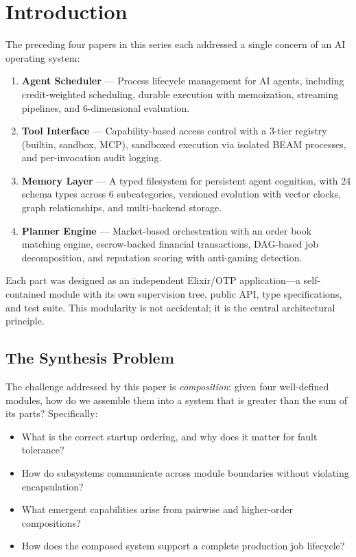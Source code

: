 \documentclass[12pt,a4paper]{article}
\theoremstyle{definition}
\begin{document}
\clearpage
\tableofcontents
\clearpage

\section{Introduction}\label{sec:intro}

The preceding four papers in this series each addressed a single concern
of an AI operating system:

\begin{enumerate}[label=\textbf{Part \Roman*:}, leftmargin=3.5em]
  \item \textbf{Agent Scheduler} --- Process lifecycle management for AI agents,
        including credit-weighted scheduling, durable execution with memoization,
        streaming pipelines, and 6-dimensional evaluation.
  \item \textbf{Tool Interface} --- Capability-based access control with a 3-tier
        registry (builtin, sandbox, MCP), sandboxed execution via isolated BEAM
        processes, and per-invocation audit logging.
  \item \textbf{Memory Layer} --- A typed filesystem for persistent agent cognition,
        with 24 schema types across 6 subcategories, versioned evolution with vector
        clocks, graph relationships, and multi-backend storage.
  \item \textbf{Planner Engine} --- Market-based orchestration with an order book
        matching engine, escrow-backed financial transactions, DAG-based job
        decomposition, and reputation scoring with anti-gaming detection.
\end{enumerate}

Each part was designed as an independent Elixir/OTP application---a self-contained
module with its own supervision tree, public API, type specifications, and test suite.
This modularity is not accidental; it is the central architectural principle.

\subsection{The Synthesis Problem}

The challenge addressed by this paper is \emph{composition}: given four well-defined
modules, how do we assemble them into a system that is greater than the sum of its parts?
Specifically:

\begin{itemize}
  \item What is the correct startup ordering, and why does it matter for fault tolerance?
  \item How do subsystems communicate across module boundaries without violating encapsulation?
  \item What emergent capabilities arise from pairwise and higher-order compositions?
  \item How does the composed system support a complete production job lifecycle?
\end{itemize}
\end{document}
